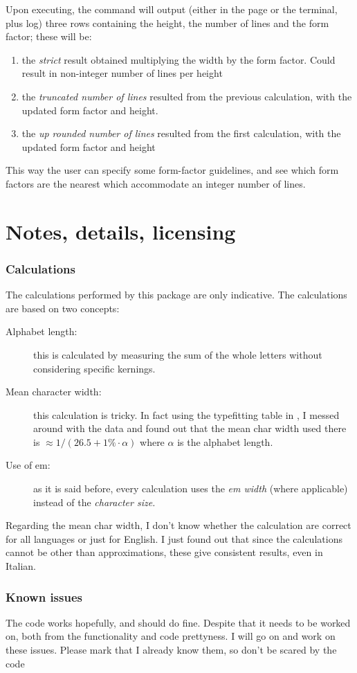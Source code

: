 \documentclass{article}
\begin{document}
Upon executing, the command will output (either in the page or the terminal, plus log) three rows containing the height, the number of lines and the form factor; these will be:
\begin{enumerate}
\item the \emph{strict} result obtained multiplying the width by the form factor. Could result in non-integer number of lines per height
\item the \emph{truncated number of lines} resulted from the previous calculation, with the updated form factor and height.
\item the \emph{up rounded number of lines} resulted from the first calculation, with the updated form factor and height
\end{enumerate}

This way the user can specify some form-factor guidelines, and see which form factors are the nearest which accommodate an integer number of lines.

\part{Notes, details, licensing}
\section{Calculations}\label{calc}
The calculations performed by this package are only indicative. The calculations are based on two concepts:
\begin{description}
\item[Alphabet length:] this is calculated by measuring the sum of the whole letters without considering specific kernings.
\item[Mean character width:] this calculation is tricky. In fact using the typefitting table in \cite{bib:bringhurst}, I messed around with the data and found out that the mean char width used there is $\approx 1/(26.5+1\%\cdot \alpha)$ where $\alpha$ is the alphabet length. 
\item[Use of em:] as it is said before, every calculation uses the \emph{em width} (where applicable) instead of the \emph{character size.}
\end{description}
Regarding the mean char width, I don’t know whether the calculation are correct for all languages or just for English. I just found out that since the calculations cannot be other than approximations, these give consistent results, even in Italian.
\section{Known issues}
The code works hopefully, and should do fine. Despite that it needs to be worked on, both from the functionality and code prettyness. I will go on and work on these issues. Please mark that I already know them, so don’t be scared by the code
\end{document}
